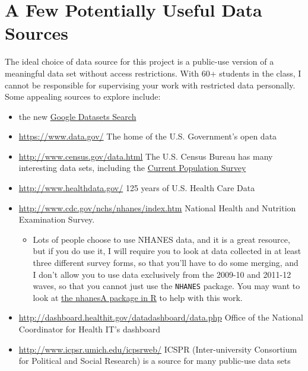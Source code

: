 \documentclass[]{book}
\providecommand{\tightlist}{%
  \setlength{\itemsep}{0pt}\setlength{\parskip}{0pt}}
\begin{document}
\hypertarget{a-few-potentially-useful-data-sources}{%
\section{A Few Potentially Useful Data Sources}\label{a-few-potentially-useful-data-sources}}

The ideal choice of data source for this project is a public-use version of a meaningful data set without access restrictions. With 60+ students in the class, I cannot be responsible for supervising your work with restricted data personally. Some appealing sources to explore include:

\begin{itemize}
\tightlist
\item
  the new \href{https://toolbox.google.com/datasetsearch}{Google Datasets Search}
\item
  \url{https://www.data.gov/} The home of the U.S. Government's open data
\item
  \url{http://www.census.gov/data.html} The U.S. Census Bureau has many interesting data sets, including the \href{http://www.census.gov/programs-surveys/cps.html}{Current Population Survey}
\item
  \url{http://www.healthdata.gov/} 125 years of U.S. Health Care Data
\item
  \url{http://www.cdc.gov/nchs/nhanes/index.htm} National Health and Nutrition Examination Survey.

  \begin{itemize}
  \tightlist
  \item
    Lots of people choose to use NHANES data, and it is a great resource, but if you do use it, I will require you to look at data collected in at least three different survey forms, so that you'll have to do some merging, and I don't allow you to use data exclusively from the 2009-10 and 2011-12 waves, so that you cannot just use the \texttt{NHANES} package. You may want to look at \href{https://cran.r-project.org/web/packages/nhanesA/vignettes/Introducing_nhanesA.html}{the nhanesA package in R} to help with this work.
  \end{itemize}
\item
  \url{http://dashboard.healthit.gov/datadashboard/data.php} Office of the National Coordinator for Health IT's dashboard
\item
  \url{http://www.icpsr.umich.edu/icpsrweb/} ICSPR (Inter-university Consortium for Political and Social Research) is a source for many public-use data sets


\end{itemize}
\end{document}
